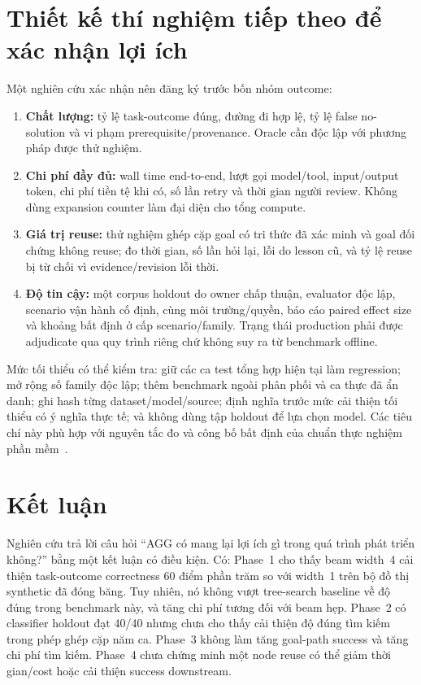 \documentclass[11pt,a4paper]{article}
\begin{document}
\section{Thiết kế thí nghiệm tiếp theo để xác nhận lợi ích}
Một nghiên cứu xác nhận nên đăng ký trước bốn nhóm outcome:
\begin{enumerate}
\item \textbf{Chất lượng:} tỷ lệ task-outcome đúng, đường đi hợp lệ, tỷ lệ false no-solution và vi phạm prerequisite/provenance. Oracle cần độc lập với phương pháp được thử nghiệm.
\item \textbf{Chi phí đầy đủ:} wall time end-to-end, lượt gọi model/tool, input/output token, chi phí tiền tệ khi có, số lần retry và thời gian người review. Không dùng expansion counter làm đại diện cho tổng compute.
\item \textbf{Giá trị reuse:} thử nghiệm ghép cặp goal có tri thức đã xác minh và goal đối chứng không reuse; đo thời gian, số lần hỏi lại, lỗi do lesson cũ, và tỷ lệ reuse bị từ chối vì evidence/revision lỗi thời.
\item \textbf{Độ tin cậy:} một corpus holdout do owner chấp thuận, evaluator độc lập, scenario vận hành cố định, cùng môi trường/quyền, báo cáo paired effect size và khoảng bất định ở cấp scenario/family. Trạng thái production phải được adjudicate qua quy trình riêng chứ không suy ra từ benchmark offline.
\end{enumerate}

Mức tối thiểu có thể kiểm tra: giữ các ca test tổng hợp hiện tại làm regression; mở rộng số family độc lập; thêm benchmark ngoài phân phối và ca thực đã ẩn danh; ghi hash từng dataset/model/source; định nghĩa trước mức cải thiện tối thiểu có ý nghĩa thực tế; và không dùng tập holdout để lựa chọn model. Các tiêu chí này phù hợp với nguyên tắc đo và công bố bất định của chuẩn thực nghiệm phần mềm \,\cite{acmsigsoftstandards}.

\section{Kết luận}
Nghiên cứu trả lời câu hỏi “AGG có mang lại lợi ích gì trong quá trình phát triển không?” bằng một kết luận có điều kiện. Có: Phase~1 cho thấy beam width~4 cải thiện task-outcome correctness 60 điểm phần trăm so với width~1 trên bộ đồ thị synthetic đã đóng băng. Tuy nhiên, nó không vượt tree-search baseline về độ đúng trong benchmark này, và tăng chi phí tương đối với beam hẹp. Phase~2 có classifier holdout đạt 40/40 nhưng chưa cho thấy cải thiện độ đúng tìm kiếm trong phép ghép cặp năm ca. Phase~3 không làm tăng goal-path success và tăng chi phí tìm kiếm. Phase~4 chưa chứng minh một node reuse có thể giảm thời gian/cost hoặc cải thiện success downstream.
\end{document}
